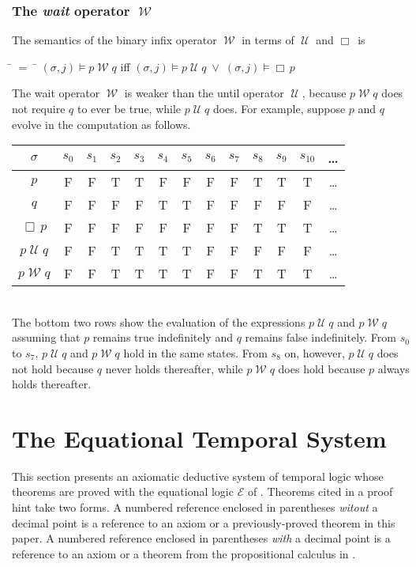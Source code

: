 \documentclass[fleqn, leqno]{article}
\newcommand{\mymathindent}{24pt} %
\newcommand{\Until}{\;\mathcal{U}\;}
\newcommand{\Wait}{\;\mathcal{W}\;}
\newcommand{\Always}{\Box\,}
\begin{document}
\subsubsection*{The \textit{wait} operator $\Wait$}

The semantics of the binary infix operator $\Wait$ in terms of $\Until$ and $\Always$ is

\begin{tabbing}
\hspace{\mymathindent} \= $= \;$ \= \kill
\> $(\sigma, j) \models p \Wait q$ \quad iff \quad $(\sigma, j) \models p \Until q \; \lor \; (\sigma, j) \models \Always p$
\end{tabbing}

The wait operator $\Wait$ is weaker than the until operator $\Until$, because $p\Wait q$ does not require $q$ to ever be true,
while $p\Until q$ does.
For example, suppose $p$ and $q$ evolve in the computation as follows.\\

\begin{tabular}{c|cccccccccccc}
$\sigma$ & $s_0$ & $s_1$ & $s_2$ & $s_3$ & $s_4$ & $s_5$ & $s_6$ & $s_7$ & $s_8$& $s_9$ & $s_{10}$& \dots \\
\hline
$p$ & F & F & T & T & F & F & F & F & T & T & T & \dots\\
$q$ & F & F & F & F & T & T & F & F & F & F & F & \dots\\
$\Always p$ & F & F & F & F & F & F & F & F & T & T & T & \dots\\
$p\Until q$ & F & F & T & T & T & T & F & F & F & F & F & \dots\\
$p\Wait q$ & F & F & T & T & T & T & F & F & T & T & T & \dots\\
\end{tabular}\\

The bottom two rows show the evaluation of the expressions $p\Until q$ and $p\Wait q$
assuming that $p$ remains true indefinitely and $q$ remains false indefinitely.
From $s_0$ to $s_7$, $p\Until q$ and $p\Wait q$ hold in the same states.
From $s_8$ on, however, $p\Until q$ does not hold because $q$ never holds thereafter,
while $p\Wait q$ does hold because $p$ always holds thereafter.

\section{The Equational Temporal System}

This section presents an axiomatic deductive system of temporal logic whose theorems are proved with the equational
logic $\mathcal{E}$ of \cite{LADM}.
Theorems cited in a proof hint take two forms.
A numbered reference enclosed in parentheses \textit{witout} a decimal point is a reference to an axiom or a previously-proved
theorem in this paper.
A numbered reference enclosed in parentheses \textit{with} a decimal point is a reference to an axiom or a
theorem from the propositional calculus in \cite{LADM}.\\
\end{document}
